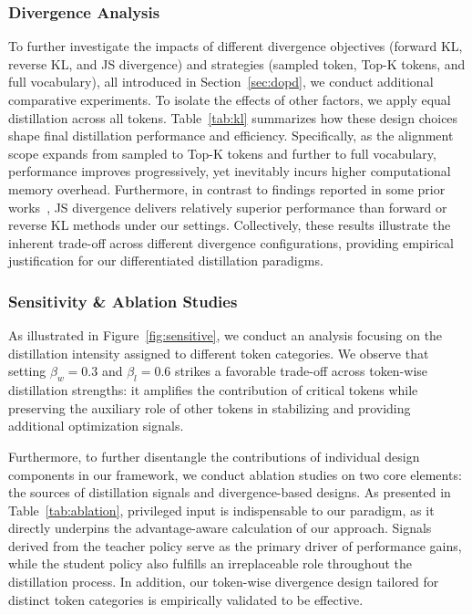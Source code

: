 \documentclass{llmxive}
\begin{document}
\subsubsection{Divergence Analysis}
To further investigate the impacts of different divergence objectives (forward KL, reverse KL, and JS divergence) and strategies (sampled token, Top-K tokens, and full vocabulary), all introduced in Section~\ref{sec:dopd}, we conduct additional comparative experiments.
To isolate the effects of other factors, we apply equal distillation across all tokens. Table~\ref{tab:kl} summarizes how these design choices shape final distillation performance and efficiency.
Specifically, as the alignment scope expands from sampled to Top-K tokens and further to full vocabulary, performance improves progressively, yet inevitably incurs higher computational memory overhead.
Furthermore, in contrast to findings reported in some prior works~\citep{zhao2026self,jin2026entropy}, JS divergence delivers relatively superior performance than forward or reverse KL methods under our settings.
Collectively, these results illustrate the inherent trade-off across different divergence configurations, providing empirical justification for our differentiated distillation paradigms.



\subsubsection{Sensitivity \& Ablation Studies}
As illustrated in Figure~\ref{fig:sensitive}, we conduct an analysis focusing on the distillation intensity assigned to different token categories. We observe that setting $\beta_{w}=0.3$ and $\beta_{l}=0.6$ strikes a favorable trade-off across token-wise distillation strengths: it amplifies the contribution of critical tokens while preserving the auxiliary role of other tokens in stabilizing and providing additional optimization signals.



Furthermore, to further disentangle the contributions of individual design components in our framework, we conduct ablation studies on two core elements: the sources of distillation signals and divergence-based designs.
As presented in Table~\ref{tab:ablation}, privileged input is indispensable to our paradigm, as it directly underpins the advantage-aware calculation of our approach. Signals derived from the teacher policy serve as the primary driver of performance gains, while the student policy also fulfills an irreplaceable role throughout the distillation process. In addition, our token-wise divergence design tailored for distinct token categories is empirically validated to be effective.
\end{document}
